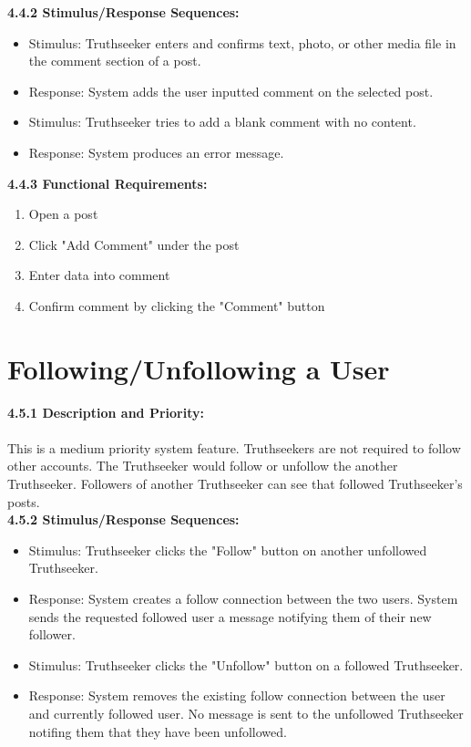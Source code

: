     \quad \textbf{4.4.2 \quad Stimulus/Response Sequences:}
    \begin{itemize}
    \item[] Stimulus: \thinspace \quad Truthseeker enters and confirms text, photo, or other media file in the comment section of a post.
    \item[] Response: \quad System adds the user inputted comment on the selected post.
    \item[] Stimulus: \thinspace \quad Truthseeker tries to add a blank comment with no content.
    \item[] Response: \quad System produces an error message.
    \end{itemize}
    
    \quad \textbf{4.4.3 \quad Functional Requirements:}
    \begin{enumerate}
        \item Open a post
        \item Click "Add Comment" under the post
        \item Enter data into comment
        \item Confirm comment by clicking the "Comment" button
    \end{enumerate}

\section{Following/Unfollowing a User}
    \quad \textbf{4.5.1 \quad Description and Priority:}\\ \\
    \null \quad This is a medium priority system feature. Truthseekers are not required to follow other accounts. The Truthseeker would follow or unfollow the another Truthseeker. Followers of another Truthseeker can see that followed Truthseeker's posts.\\
    
    \quad \textbf{4.5.2 \quad Stimulus/Response Sequences:}
    \begin{itemize}
    \item[] Stimulus: \thinspace \quad Truthseeker clicks the "Follow" button on another unfollowed Truthseeker.
    \item[] Response: \quad System creates a follow connection between the two users. System sends the requested followed user a message notifying them of their new follower.
    \item[] Stimulus: \quad Truthseeker clicks the "Unfollow" button on a followed Truthseeker.
    \item[] Response: \quad System removes the existing follow connection between the user and currently followed user. No message is sent to the unfollowed Truthseeker notifing them that they have been unfollowed.
    \end{itemize}
    
